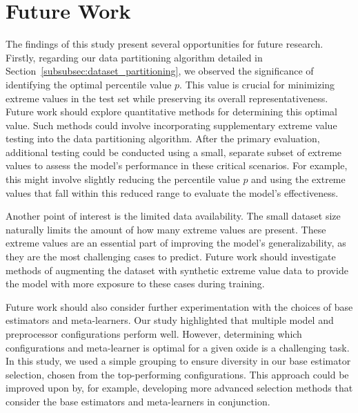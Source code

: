 \section{Future Work}\label{sec:future_work}
The findings of this study present several opportunities for future research.
Firstly, regarding our data partitioning algorithm detailed in Section~\ref{subsubsec:dataset_partitioning}, we observed the significance of identifying the optimal percentile value $p$. 
This value is crucial for minimizing extreme values in the test set while preserving its overall representativeness.
Future work should explore quantitative methods for determining this optimal value.
Such methods could involve incorporating supplementary extreme value testing into the data partitioning algorithm. 
After the primary evaluation, additional testing could be conducted using a small, separate subset of extreme values to assess the model's performance in these critical scenarios.
For example, this might involve slightly reducing the percentile value $p$ and using the extreme values that fall within this reduced range to evaluate the model's effectiveness.

Another point of interest is the limited data availability.
The small dataset size naturally limits the amount of how many extreme values are present.
These extreme values are an essential part of improving the model's generalizability, as they are the most challenging cases to predict.
Future work should investigate methods of augmenting the dataset with synthetic extreme value data to provide the model with more exposure to these cases during training.

Future work should also consider further experimentation with the choices of base estimators and meta-learners.
Our study highlighted that multiple model and preprocessor configurations perform well.
However, determining which configurations and meta-learner is optimal for a given oxide is a challenging task.
In this study, we used a simple grouping to ensure diversity in our base estimator selection, chosen from the top-performing configurations.
This approach could be improved upon by, for example, developing more advanced selection methods that consider the base estimators and meta-learners in conjunction. 